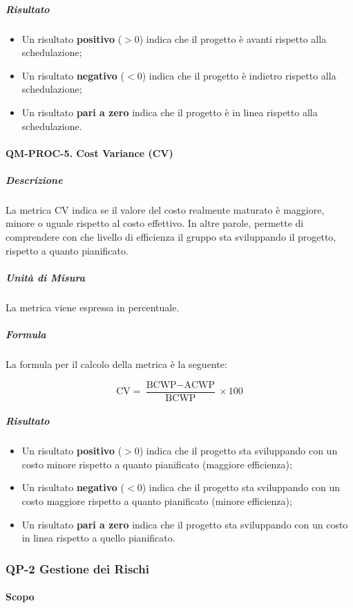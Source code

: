			\subparagraph{Risultato}
			\begin{itemize}
				\item Un risultato \textbf{positivo} (\(> 0\)) indica che il progetto è avanti rispetto alla schedulazione;
				\item Un risultato \textbf{negativo} (\(< 0\)) indica che il progetto è indietro rispetto alla schedulazione;
				\item Un risultato \textbf{pari a zero} indica che il progetto è in linea rispetto alla schedulazione.
			\end{itemize}

		\paragraph{QM-PROC-5. Cost Variance (CV)}

			\subparagraph{Descrizione}
			La metrica CV indica se il valore del costo realmente maturato è maggiore, minore o uguale rispetto al costo effettivo. In altre parole, permette di comprendere con che livello di efficienza il gruppo sta sviluppando il progetto, rispetto a quanto pianificato.

			\subparagraph{Unità di Misura}
			La metrica viene espressa in percentuale.

			\subparagraph{Formula}
			La formula per il calcolo della metrica è la seguente:

			\[
				\text{CV} = \frac{\text{BCWP} - \text{ACWP}}{\text{BCWP}} \times 100
			\]

			\subparagraph{Risultato}
			\begin{itemize}
				\item Un risultato \textbf{positivo} (\(> 0\)) indica che il progetto sta sviluppando con un costo minore rispetto a quanto pianificato (maggiore efficienza);
				\item Un risultato \textbf{negativo} (\(< 0\)) indica che il progetto sta sviluppando con un costo maggiore rispetto a quanto pianificato (minore efficienza);
				\item Un risultato \textbf{pari a zero} indica che il progetto sta sviluppando con un costo in linea rispetto a quello pianificato.
			\end{itemize}

	\subsubsection{QP-2 Gestione dei Rischi}

		\paragraph{Scopo}

